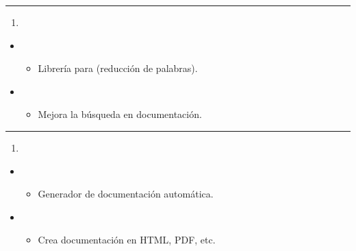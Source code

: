\documentclass[a4paper,10pt,spanish]{sphinxmanual}
\begin{document}
\bigskip\hrule\bigskip

\begin{enumerate}
%
\setcounter{enumi}{28}
\item {} 
\sphinxAtStartPar
{}

\end{enumerate}
\begin{itemize}
\item {} 
\sphinxAtStartPar
{}
\begin{itemize}
\item {} 
\sphinxAtStartPar
Librería para  (reducción de palabras).

\end{itemize}

\item {} 
\sphinxAtStartPar
{}
\begin{itemize}
\item {} 
\sphinxAtStartPar
Mejora la búsqueda en documentación.

\end{itemize}

\end{itemize}


\bigskip\hrule\bigskip

\begin{enumerate}
%
\setcounter{enumi}{29}
\item {} 
\sphinxAtStartPar
{}

\end{enumerate}
\begin{itemize}
\item {} 
\sphinxAtStartPar
{}
\begin{itemize}
\item {} 
\sphinxAtStartPar
Generador de documentación automática.

\end{itemize}

\item {} 
\sphinxAtStartPar
{}
\begin{itemize}
\item {} 
\sphinxAtStartPar
Crea documentación en HTML, PDF, etc.

\end{itemize}

\end{itemize}
\end{document}
